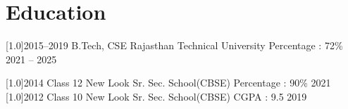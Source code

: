 \documentclass[british]{cv-style}     %
\begin{document}
\vspace{-0.75cm} %

\section{Education}
\vspace{-0.1cm}
\begin{entrylist}
\entry
{\scalebox{.8}[1.0]{2015--2019}}
{B.Tech, CSE \vspace{0.2cm}}
{\hfill \footnotesize{Rajasthan Technical University}}
{\small{Percentage : 72\%} \hfill \footnotesize{2021 -- 2025} \vspace{0.0cm}}

\entry
{\scalebox{.8}[1.0]{2014}}
{Class 12 \vspace{0.2cm}}
{\hfill \footnotesize{New Look Sr. Sec. School(CBSE)}}
{\small{Percentage : 90\%} \hfill \footnotesize{2021} \vspace{-0.05cm}}
\entry
{\scalebox{.8}[1.0]{2012}}
{Class 10 \vspace{0.2cm}}
{\hfill \footnotesize{New Look Sr. Sec. School(CBSE)}}
{\small{CGPA : 9.5} \hfill \footnotesize{2019} \vspace{-0.05cm}}
\end{entrylist}
\end{document}
